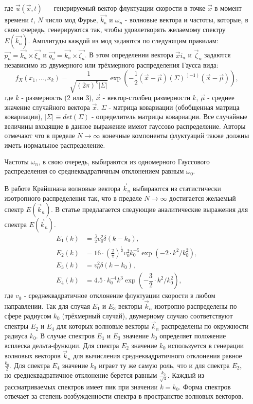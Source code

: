 \noindent
где $\vec{u} (\vec{x}, t)$ — генерируемый вектор флуктуации скорости в точке $\vec{x}$ в момент времени $t$, $N$ число мод Фурье, $\vec{k_n}$ и $\omega_n$ - волновые вектора и частоты, которые, в свою очередь, генерируются так, чтобы удовлетворять желаемому спектру $E(\vec{k_n})$. Амплитуды каждой из мод задаются по следующим правилам: $\vec{p_n} = \vec{k_n} \times \vec{\xi_n}$ и $\vec{q_n} = \vec{k_n} \times \vec{\zeta_n}$. В этом определении вектора $\vec xi_n$ и $\vec \zeta_n$ задаются независимо из двумерного или трёхмерного распределения Гаусса вида:  
\begin{equation}
  \label{eq:gauss_distr1}
  f_X (x_1, ..., x_k) = \frac{1}{\sqrt{(2 \pi)^k \left|\Sigma\right|}} \exp{(- \frac{1}{2} (\vec{x} - \vec{\mu}) (\Sigma)^(-1) (\vec{x} - \vec{\mu}) )},
\end{equation}
\noindent
где $k$ - размерность (2 или 3), $\vec x$ - вектор-столбец размерности $k$, $\vec \mu$ - среднее значение случайного вектора $\vec x$, $\Sigma$ - матрица ковариации (обобщенная матрица ковариации), $\left| \Sigma \right| \equiv det(\Sigma)$ - определитель матрицы ковариации. Все случайные величины входящие в данное выражение имеют гауссово распределение. Авторы отмечают что в пределе $N \rightarrow \infty$ конечные компоненты флуктуаций также должны иметь нормальное распределение.

Частоты $\omega_n$, в свою очередь, выбираются из одномерного Гауссового распределения со среднеквадратичным отклонением равным $\omega_0$. 

В работе Крайшнана волновые вектора $\vec k_n$ выбираются из статистически изотропного распределения так, что в пределе $N \rightarrow \infty$ достигается желаемый спектр $E(\vec k_n)$. В статье предлагается следующие аналитические выражения для спектра $E(\vec k_n)$.
\begin{align}
  \label{eq:spectral_equation2}
  E_1(k) & = \frac{3}{2} v_0^2 \delta(k-k_0), \nonumber \\
  E_2(k) & = 16 \cdot (\frac{2}{\pi})^{\frac{1}{2}} v_0^2 k_0^{-5} \exp{(- 2 \cdot k^2 / k_0^2)}, \nonumber \\
  E_3(k) & = v_0^2 \delta(k-k_0), \nonumber \\
  E_4(k) & = 4.5 \cdot k_0^{-4} k^3 \exp{(- \dfrac{3}{2} \cdot k^2 / k_0^2)},
\end{align}
\noindent
где $v_0$ - среднеквадратичное отклонение флуктуации скорости в любом направлении. Так для случая $E_1$ и $E_3$ векторы $\vec k_n$ изотропно распределены по сфере радиусом $k_0$ (трёхмерный случай), двумерному случаю соответствуют спектры $E_2$ и $E_4$ для которых волновые векторы $\vec k_n$ распределены по окружности радиуса $k_0$. В случае спектров $E_1$ и $E_3$ значение $k_0$ определяет положение всплеска дельта-функции. Для спектра $E_2$ значение $k_0$ используется в генерации волновых векторов $\vec k_n$ для вычисления среднеквадратичного отклонения равное $\frac{k_0}{2}$. Для спектра $E_4$ значение $k_0$ играет ту же самую роль, что и для спектра $E_2$, но среднеквадратичное отклонение берется равным $\frac{k_0}{\sqrt{3}}$. Каждый из рассматриваемых спектров имеет пик при значении $k = k_0$. Форма спектров отвечает за степень возбужденности спектра в пространстве волновых векторов. 


